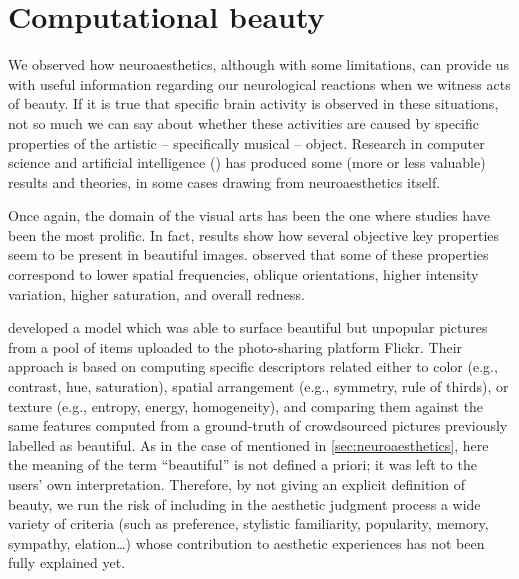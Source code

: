 \section{Computational beauty}\label{sec:comp-beauty}
We observed how neuroaesthetics, although with some limitations, can provide us with useful information regarding our neurological reactions when we witness acts of beauty. If it is true that specific brain activity is observed in these situations, not so much we can say about whether these activities are caused by specific properties of the artistic -- specifically musical -- object. Research in computer science and artificial intelligence () has produced some (more or less valuable) results and theories, in some cases drawing from neuroaesthetics itself.

Once again, the domain of the visual arts has been the one where studies have been the most prolific. In fact, results show how several objective key properties seem to be present in beautiful images. \cite{jacobs2016aesthetics} observed that some of these properties correspond to lower spatial frequencies, oblique orientations, higher intensity variation, higher saturation, and overall redness.

\cite{schifanella2015image} developed a model which was able to surface beautiful but unpopular pictures from a pool of items uploaded to the photo-sharing platform Flickr. Their approach is based on computing specific descriptors related either to color (e.g., contrast, hue, saturation), spatial arrangement (e.g., symmetry, rule of thirds), or texture (e.g., entropy, energy, homogeneity), and comparing them against the same features computed from a ground-truth of crowdsourced pictures previously labelled as beautiful. As in the case of \cite{kawabata2004neural} mentioned in \autoref{sec:neuroaesthetics}, here the meaning of the term ``beautiful'' is not defined a priori; it was left to the users' own interpretation. Therefore, by not giving an explicit definition of beauty, we run the risk of including in the aesthetic judgment process a wide variety of criteria (such as preference, stylistic familiarity, popularity, memory, sympathy, elation\ldots) whose contribution to aesthetic experiences has not been fully explained yet.

